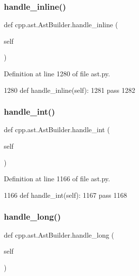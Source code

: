 \subsubsection{\texorpdfstring{handle\+\_\+inline()}{handle\_inline()}}
{\footnotesize\ttfamily def cpp.\+ast.\+Ast\+Builder.\+handle\+\_\+inline (\begin{DoxyParamCaption}\item[{}]{self }\end{DoxyParamCaption})}



Definition at line 1280 of file ast.\+py.


\begin{DoxyCode}
1280     \textcolor{keyword}{def }handle\_inline(self):
1281         \textcolor{keywordflow}{pass}
1282 
\end{DoxyCode}
\mbox{\label{classcpp_1_1ast_1_1AstBuilder_a6f824335dd53e12a76d6f91ab69c627c}} 
\subsubsection{\texorpdfstring{handle\+\_\+int()}{handle\_int()}}
{\footnotesize\ttfamily def cpp.\+ast.\+Ast\+Builder.\+handle\+\_\+int (\begin{DoxyParamCaption}\item[{}]{self }\end{DoxyParamCaption})}



Definition at line 1166 of file ast.\+py.


\begin{DoxyCode}
1166     \textcolor{keyword}{def }handle\_int(self):
1167         \textcolor{keywordflow}{pass}
1168 
\end{DoxyCode}
\mbox{\label{classcpp_1_1ast_1_1AstBuilder_a08f56b25e6bed18aa955f8cad462d2f9}} 
\subsubsection{\texorpdfstring{handle\+\_\+long()}{handle\_long()}}
{\footnotesize\ttfamily def cpp.\+ast.\+Ast\+Builder.\+handle\+\_\+long (\begin{DoxyParamCaption}\item[{}]{self }\end{DoxyParamCaption})}



